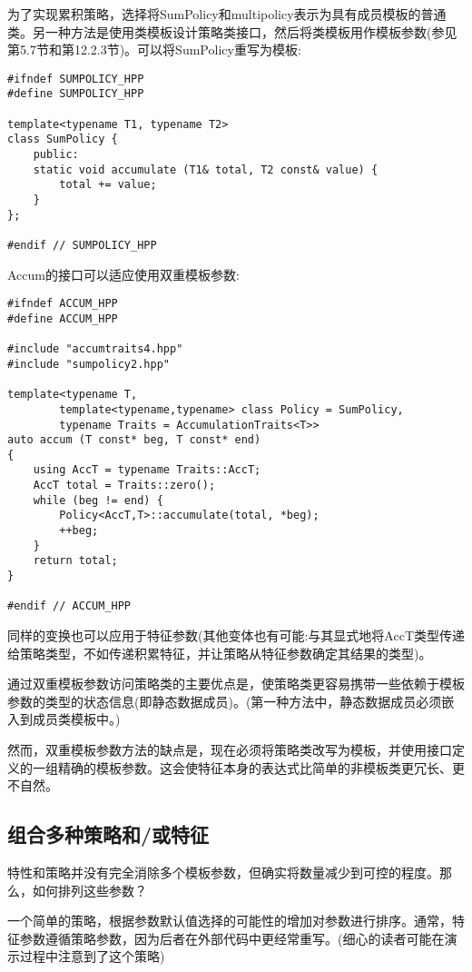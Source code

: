 为了实现累积策略，选择将SumPolicy和multipolicy表示为具有成员模板的普通类。另一种方法是使用类模板设计策略类接口，然后将类模板用作模板参数(参见第5.7节和第12.2.3节)。可以将SumPolicy重写为模板:

\begin{lstlisting}[style=styleCXX]
#ifndef SUMPOLICY_HPP
#define SUMPOLICY_HPP

template<typename T1, typename T2>
class SumPolicy {
	public:
	static void accumulate (T1& total, T2 const& value) {
		total += value;
	}
};

#endif // SUMPOLICY_HPP
\end{lstlisting}

Accum的接口可以适应使用双重模板参数:

\begin{lstlisting}[style=styleCXX]
#ifndef ACCUM_HPP
#define ACCUM_HPP

#include "accumtraits4.hpp"
#include "sumpolicy2.hpp"

template<typename T,
		template<typename,typename> class Policy = SumPolicy,
		typename Traits = AccumulationTraits<T>>
auto accum (T const* beg, T const* end)
{
	using AccT = typename Traits::AccT;
	AccT total = Traits::zero();
	while (beg != end) {
		Policy<AccT,T>::accumulate(total, *beg);
		++beg;
	}
	return total;
}

#endif // ACCUM_HPP
\end{lstlisting}

同样的变换也可以应用于特征参数(其他变体也有可能:与其显式地将AccT类型传递给策略类型，不如传递积累特征，并让策略从特征参数确定其结果的类型)。

通过双重模板参数访问策略类的主要优点是，使策略类更容易携带一些依赖于模板参数的类型的状态信息(即静态数据成员)。(第一种方法中，静态数据成员必须嵌入到成员类模板中。)

然而，双重模板参数方法的缺点是，现在必须将策略类改写为模板，并使用接口定义的一组精确的模板参数。这会使特征本身的表达式比简单的非模板类更冗长、更不自然。

\subsection{组合多种策略和/或特征}

特性和策略并没有完全消除多个模板参数，但确实将数量减少到可控的程度。那么，如何排列这些参数？

一个简单的策略，根据参数默认值选择的可能性的增加对参数进行排序。通常，特征参数遵循策略参数，因为后者在外部代码中更经常重写。(细心的读者可能在演示过程中注意到了这个策略)

